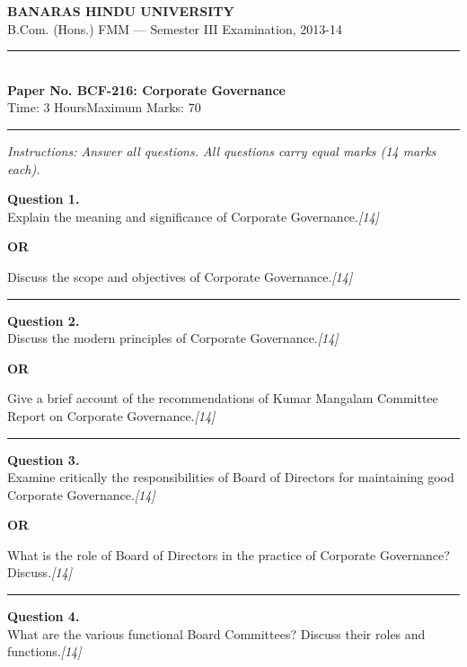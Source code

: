 \documentclass[11pt,a4paper]{article}
\newcommand{\pts}[1]{\hfill   \textit{[#1]}}
\begin{document}
\begin{center}
  {\large\bfseries BANARAS HINDU UNIVERSITY}\\[2pt]
  {\normalsize B.Com. (Hons.) FMM --- Semester III Examination, 2013-14}\\[6pt]
  \rule{0.8\linewidth}{0.5pt}\\[6pt]
  {\large\bfseries Paper No. BCF-216: Corporate Governance}\\[4pt]
  {\normalsize Time: 3 Hours\hfill Maximum Marks: 70}
\end{center}

\rule{\linewidth}{0.4pt}

\smallskip



\noindent   \textit{Instructions: Answer all questions. All questions carry equal marks (14 marks each).}

\bigskip




\noindent   \textbf{Question 1.} \\
Explain the meaning and significance of Corporate Governance.\pts{14}

\centerline{   \textbf{OR}}

Discuss the scope and objectives of Corporate Governance.\pts{14}

\medskip\rule{\linewidth}{0.2pt}




\noindent   \textbf{Question 2.} \\
Discuss the modern principles of Corporate Governance.\pts{14}

\centerline{   \textbf{OR}}

Give a brief account of the recommendations of Kumar Mangalam Committee Report on Corporate Governance.\pts{14}

\medskip\rule{\linewidth}{0.2pt}




\noindent   \textbf{Question 3.} \\
Examine critically the responsibilities of Board of Directors for maintaining good Corporate Governance.\pts{14}

\centerline{   \textbf{OR}}

What is the role of Board of Directors in the practice of Corporate Governance? Discuss.\pts{14}

\medskip\rule{\linewidth}{0.2pt}




\noindent   \textbf{Question 4.} \\
What are the various functional Board Committees? Discuss their roles and functions.\pts{14}
\end{document}
